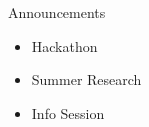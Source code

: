 \begin{frame}{Announcements}
    \begin{itemize}
        \item Hackathon
        \item Summer Research
        \item Info Session
    \end{itemize}
\end{frame}
